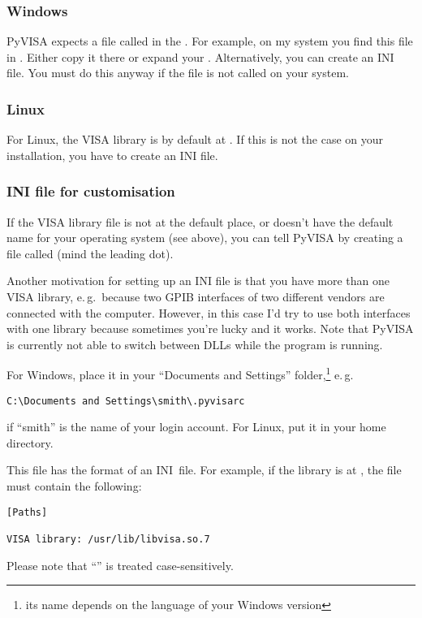 \documentclass{howto}
\begin{document}
\subsubsection{Windows}

PyVISA expects a file called  in the \@.  For
example, on my system you find this file in .
Either copy it there or expand your .  Alternatively, you can
create an INI file.  You must do this anyway if the file is not called
 on your system.


\subsubsection{Linux}

For Linux, the VISA library is by default at
.  If this is not the case on
your installation, you have to create an INI file.


\subsubsection{INI file for customisation}

If the VISA library file is not at the default place, or doesn't have the
default name for your operating system (see above), you can tell PyVISA by
creating a file called  (mind the leading dot).

Another motivation for setting up an INI file is that you have more than one
VISA library, e.\,g.\ because two GPIB interfaces of two different vendors are
connected with the computer.  However, in this case I'd try to use both
interfaces with one library because sometimes you're lucky and it works.  Note
that PyVISA is currently not able to switch between DLLs while the program is
running.

For Windows, place it in your ``Documents and Settings'' folder,\footnote{its
  name depends on the language of your Windows version} e.\,g.\
\begin{verbatim}
C:\Documents and Settings\smith\.pyvisarc
\end{verbatim}
if ``smith'' is the name of your login account.  For Linux, put it in your home
directory.

This file has the format of an INI~file.  For example, if the library is at
\file{/usr/lib/libvisa.so.7}, the file \file{.pyvisarc} must contain the
following:
\begin{verbatim}
[Paths]

VISA library: /usr/lib/libvisa.so.7
\end{verbatim}
Please note that ``\code{[Paths]}'' is treated case-sensitively.
\end{document}
